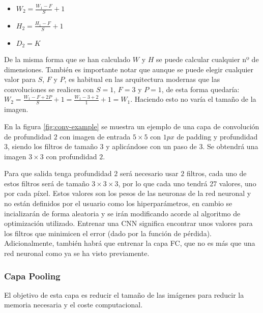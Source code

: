 \begin{itemize}
\item $W_2 = \frac{W_1 - F}{S} + 1$
\item $H_2 = \frac{H_1 - F}{S} + 1$
\item $D_2 = K$
\end{itemize}

De la misma forma que se han calculado $W$ y $H$ se puede calcular cualquier nº de dimensiones. También es importante notar que aunque se puede elegir cualquier valor para $S$, $F$ y $P$, es habitual en las arquitectura modernas que las convoluciones se realicen con $S=1$, $F=3$ y $P=1$, de esta forma quedaría: $W_2 = \frac{W_1-F+2P}{S} + 1 = \frac{W_1 - 3 + 2}{1} + 1 = W_1$. Haciendo esto no varía el tamaño de la imagen.

En la figura \ref{fig:conv-example}\cite{Li2020} se muestra un ejemplo de una capa de convolución de profundidad $2$ con imagen de entrada $5 \times 5$ con $1 px$ de padding y profundidad $3$, siendo los filtros de tamaño $3$ y aplicándose con un paso de $3$. Se obtendrá una imagen $3\times 3$ con profundidad $2$.

Para que salida tenga profundidad $2$ será necesario usar $2$ filtros, cada uno de estos filtros será de tamaño $3\times 3 \times 3$, por lo que cada uno tendrá 27 valores, uno por cada píxel. Estos valores son los pesos de las neuronas de la red neuronal y no están definidos por el usuario como los hiperparámetros, en cambio se incializarán de forma aleatoria y se irán modificando acorde al algoritmo de optimización utilizado. Entrenar una CNN significa encontrar unos valores para los filtros que minimicen el error (dado por la función de pérdida). Adicionalmente, también habrá que entrenar la capa FC, que no es más que una red neuronal como ya se ha visto previamente.


\subsubsection{Capa Pooling}

El objetivo de esta capa es reducir el tamaño de las imágenes para reducir la memoria necesaria y el coste computacional.

